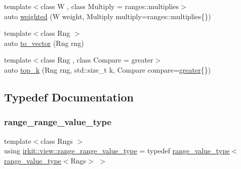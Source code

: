 \begin{DoxyCompactItemize}
\item 
{\footnotesize template$<$class W , class Multiply  = ranges\+::multiplies$>$ }\\auto \mbox{\hyperlink{namespaceirkit_1_1view_ab3c27d862e946a966c4d7f004407499a}{weighted}} (W weight, Multiply multiply=ranges\+::multiplies\{\})
\item 
{\footnotesize template$<$class Rng $>$ }\\auto \mbox{\hyperlink{namespaceirkit_1_1view_a47e3af80728642c02c0204e1db2ecbd4}{to\+\_\+vector}} (Rng rng)
\item 
{\footnotesize template$<$class Rng , class Compare  = greater$>$ }\\auto \mbox{\hyperlink{namespaceirkit_1_1view_a94331e22539c88bf23e8d801c004fee2}{top\+\_\+k}} (Rng rng, std\+::size\+\_\+t k, Compare compare=\mbox{\hyperlink{structirkit_1_1view_1_1greater}{greater}}\{\})
\end{DoxyCompactItemize}


\subsection{Typedef Documentation}
\mbox{\label{namespaceirkit_1_1view_ae24f427c615bdecfcded89b8f028fb6c}} 
\subsubsection{\texorpdfstring{range\+\_\+range\+\_\+value\+\_\+type}{range\_range\_value\_type}}
{\footnotesize\ttfamily template$<$class Rngs $>$ \\
using \mbox{\hyperlink{namespaceirkit_1_1view_ae24f427c615bdecfcded89b8f028fb6c}{irkit\+::view\+::range\+\_\+range\+\_\+value\+\_\+type}} = typedef \mbox{\hyperlink{namespaceirkit_1_1view_aa01f8ad24d5b6600bc31631b56448817}{range\+\_\+value\+\_\+type}}$<$\mbox{\hyperlink{namespaceirkit_1_1view_aa01f8ad24d5b6600bc31631b56448817}{range\+\_\+value\+\_\+type}}$<$Rngs$>$ $>$}

\mbox{\label{namespaceirkit_1_1view_aa01f8ad24d5b6600bc31631b56448817}} 

